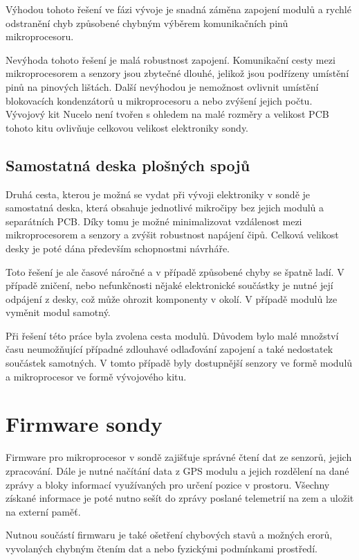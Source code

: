 \documentclass[twoside]{ctuthesis}
\theoremstyle{plain}
\theoremstyle{definition}
\theoremstyle{note}
\begin{document}
		Výhodou tohoto řešení ve fázi vývoje je snadná záměna zapojení modulů a rychlé odstranění chyb způsobené chybným výběrem komunikačních pinů mikroprocesoru.

		Nevýhoda tohoto řešení je malá robustnost zapojení. Komunikační cesty mezi mikroprocesorem a senzory jsou zbytečné dlouhé, jelikož jsou podřízeny umístění pinů na pinových lištách. Další nevýhodou je nemožnost ovlivnit umístění blokovacích kondenzátorů u mikroprocesoru a nebo zvýšení jejich počtu. Vývojový kit Nucelo není tvořen s ohledem na malé rozměry a velikost PCB tohoto kitu ovlivňuje celkovou velikost elektroniky sondy.

		\subsection{Samostatná deska plošných spojů}
		Druhá cesta, kterou je možná se vydat při vývoji elektroniky v sondě je samostatná deska, která obsahuje jednotlivé mikročipy bez jejich modulů a separátních PCB. Díky tomu je možné minimalizovat vzdálenost mezi mikroprocesorem a senzory a zvýšit robustnost napájení čipů. Celková velikost desky je poté dána především schopnostmi návrháře. 
		
		Toto řešení je ale časové náročné a v případě způsobené chyby se špatně ladí. V případě zničení, nebo nefunkčnosti nějaké elektronické součástky je nutné její odpájení z desky, což může ohrozit komponenty v okolí. V případě modulů lze vyměnit modul samotný.

		Při řešení této práce byla zvolena cesta modulů. Důvodem bylo malé množství času neumožňující případné zdlouhavé odlaďování zapojení a také nedostatek součástek samotných. V tomto případě byly dostupnější senzory ve formě modulů a mikroprocesor ve formě vývojového kitu. 

		

	\section{Firmware sondy}
	Firmware pro mikroprocesor v sondě zajišťuje správné čtení dat ze senzorů, jejich zpracování. Dále je nutné načítání data z GPS modulu a jejich rozdělení na dané zprávy a bloky informací využívaných pro určení pozice v prostoru. Všechny získané informace je poté nutno sešít do zprávy poslané telemetrií na zem a uložit na externí paměť. 

	Nutnou součástí firmwaru je také ošetření chybových stavů a možných erorů, vyvolaných chybným čtením dat a nebo fyzickými podmínkami prostředí.
\end{document}
